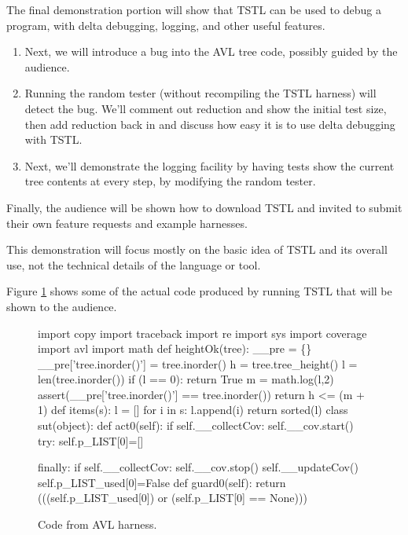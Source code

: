 \documentclass{sig-alternate}
\begin{document}
The final demonstration portion will show that TSTL can be used to
debug a program, with delta debugging, logging, and other useful
features.

\begin{enumerate}
\item Next, we will introduce a bug into the AVL tree code, possibly
  guided by the audience.
\item Running the random tester (without recompiling the TSTL harness)
  will detect the bug.  We'll comment out reduction and show the
  initial test size, then add reduction back in and discuss how easy
  it is to use delta debugging with TSTL.
\item Next, we'll demonstrate the logging facility by having tests
  show the current tree contents at every step, by modifying the
  random tester.
\end{enumerate}

Finally, the audience will be shown how to download TSTL and
  invited to submit their own feature requests and example harnesses.

This demonstration will focus mostly on the basic idea of TSTL and its
overall use, not the technical details of the language or tool.

Figure \ref{fig:code} shows some of the actual code produced by
running TSTL that will be shown to the audience.

\begin{figure}
\begin{code}
import copy
import traceback
import re
import sys
import coverage
import avl
import math
def heightOk(tree):
    \_\_pre = \{\}
    \_\_pre['tree.inorder()'] = tree.inorder()
    h = tree.tree\_height()
    l = len(tree.inorder())
    if (l == 0):
       return True
    m = math.log(l,2)
    assert(\_\_pre['tree.inorder()'] == 
           tree.inorder())
    return h <= (m + 1)
def items(s):
    l = []
    for i in s:
       l.append(i)
    return sorted(l)
class sut(object):
    def act0(self):
        if self.\_\_collectCov:
            self.\_\_cov.start()
        try:
            self.p\_LIST[0]=[]

        finally:
            if self.\_\_collectCov:
                self.\_\_cov.stop()
                self.\_\_updateCov()
        self.p\_LIST\_used[0]=False
    def guard0(self):
        return (((self.p\_LIST\_used[0]) or 
               (self.p\_LIST[0] == None)))
\end{code}
\caption{Code from AVL harness.}
\label{fig:code}
\end{figure}
\end{document}

